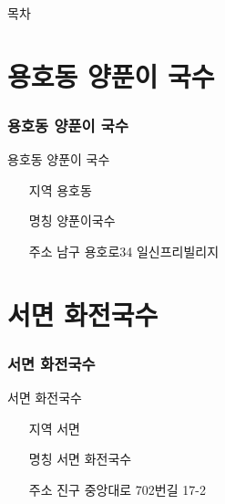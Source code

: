 \documentclass[aspectratio=1610,17pt,xcolor=pdftex,dvipsnames,table,handout]{beamer}
\begin{document}
		\begin{frame} [plain]{목차}
		\tableofcontents%

\label{part1} 	%

		\end{frame}
		

		\section{ 용호동 양푼이 국수 }
		\begin{frame} [t,plain]
		\frametitle{ 용호동 양푼이 국수 }
			\begin{block} { 용호동 양푼이 국수 }
			\setlength{\leftmargini}{4em}			
			\begin{itemize}
				\item [지역] 용호동	
				\item [명칭] 양푼이국수	
				\item [주소] 남구 용호로34 일신프리빌리지
			\end{itemize}
			\end{block}						
		\end{frame}						

		\section{ 서면 화전국수	}
		\begin{frame} [t,plain]
		\frametitle{ 서면 화전국수	}
			\begin{block} { 서면 화전국수	}
			\setlength{\leftmargini}{4em}			
			\begin{itemize}
				\item [지역] 서면	
				\item [명칭] 서면 화전국수	
				\item [주소] 진구 중앙대로 702번길 17-2
			\end{itemize}
			\end{block}						
		\end{frame}						


\end{document}
